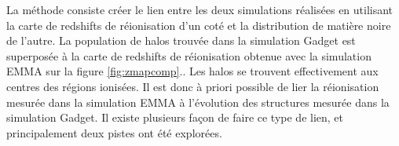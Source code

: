 
La méthode consiste créer le lien entre les deux simulations réalisées en utilisant la carte de redshifts de réionisation d'un coté et la distribution de matière noire de l'autre.
La population de halos trouvée dans la simulation Gadget est superposée à la carte de redshifts de réionisation obtenue avec la simulation EMMA sur la figure \ref{fig:zmapcomp}..
Les halos se trouvent effectivement aux centres des régions ionisées.
Il est donc à priori possible de lier la réionisation mesurée dans la simulation EMMA à l'évolution des structures mesurée dans la simulation Gadget.
Il existe plusieurs façon de faire ce type de lien, et principalement deux pistes ont été explorées.


